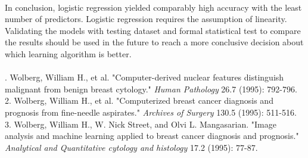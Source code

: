 \documentclass[11pt]{article}
\begin{document}
 \vspace{2ex}\\ 
In conclusion, logistic regression yielded comparably high accuracy with the  least number of predictors. Logistic regression requires the assumption of linearity. Validating the models with testing dataset and formal statistical test to compare the results should be used in the future to reach a more conclusive decision about which learning algorithm is better. \vspace{2ex}\\

 \vspace{2ex}\\ 
. Wolberg, William H., et al. "Computer-derived nuclear features distinguish malignant from benign breast cytology." \emph {Human Pathology} 26.7 (1995): 792-796.\vspace{1.5ex}\\
2. Wolberg, William H., et al. "Computerized breast cancer diagnosis and prognosis from fine-needle aspirates." \emph{Archives of Surgery} 130.5 (1995): 511-516.\vspace{1.5ex}\\
3. Wolberg, William H., W. Nick Street, and Olvi L. Mangasarian. "Image analysis and machine learning applied to breast cancer diagnosis and prognosis." \emph{Analytical and Quantitative cytology and histology} 17.2 (1995): 77-87.\vspace{1.5ex}
\end{document}
